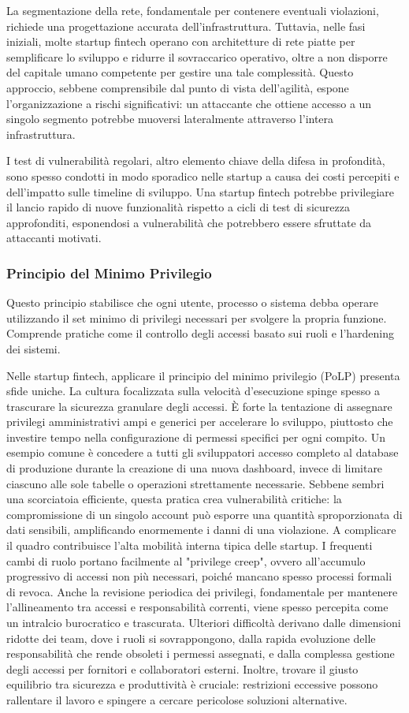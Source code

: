 \documentclass[a4paper,12pt]{report}
\begin{document}
La segmentazione della rete, fondamentale per contenere eventuali violazioni, richiede una progettazione accurata dell'infrastruttura. Tuttavia, nelle fasi iniziali, molte startup fintech operano con architetture di rete piatte per semplificare lo sviluppo e ridurre il sovraccarico operativo, oltre a non disporre del capitale umano competente per gestire una tale complessità. Questo approccio, sebbene comprensibile dal punto di vista dell'agilità, espone l'organizzazione a rischi significativi: un attaccante che ottiene accesso a un singolo segmento potrebbe muoversi lateralmente attraverso l'intera infrastruttura.

I test di vulnerabilità regolari, altro elemento chiave della difesa in profondità, sono spesso condotti in modo sporadico nelle startup a causa dei costi percepiti e dell'impatto sulle timeline di sviluppo. Una startup fintech potrebbe privilegiare il lancio rapido di nuove funzionalità rispetto a cicli di test di sicurezza approfonditi, esponendosi a vulnerabilità che potrebbero essere sfruttate da attaccanti motivati.
\subsubsection{Principio del Minimo Privilegio}
Questo principio stabilisce che ogni utente, processo o sistema debba operare utilizzando il set minimo di privilegi necessari per svolgere la propria funzione. Comprende pratiche come il controllo degli accessi basato sui ruoli e l'hardening dei sistemi.

Nelle startup fintech, applicare il principio del minimo privilegio (PoLP) presenta sfide uniche. La cultura focalizzata sulla velocità d'esecuzione spinge spesso a trascurare la sicurezza granulare degli accessi. È forte la tentazione di assegnare privilegi amministrativi ampi e generici per accelerare lo sviluppo, piuttosto che investire tempo nella configurazione di permessi specifici per ogni compito.
Un esempio comune è concedere a tutti gli sviluppatori accesso completo al database di produzione durante la creazione di una nuova dashboard, invece di limitare ciascuno alle sole tabelle o operazioni strettamente necessarie. Sebbene sembri una scorciatoia efficiente, questa pratica crea vulnerabilità critiche: la compromissione di un singolo account può esporre una quantità sproporzionata di dati sensibili, amplificando enormemente i danni di una violazione.
A complicare il quadro contribuisce l'alta mobilità interna tipica delle startup. I frequenti cambi di ruolo portano facilmente al "privilege creep", ovvero all'accumulo progressivo di accessi non più necessari, poiché mancano spesso processi formali di revoca. Anche la revisione periodica dei privilegi, fondamentale per mantenere l'allineamento tra accessi e responsabilità correnti, viene spesso percepita come un intralcio burocratico e trascurata.
Ulteriori difficoltà derivano dalle dimensioni ridotte dei team, dove i ruoli si sovrappongono, dalla rapida evoluzione delle responsabilità che rende obsoleti i permessi assegnati, e dalla complessa gestione degli accessi per fornitori e collaboratori esterni. Inoltre, trovare il giusto equilibrio tra sicurezza e produttività è cruciale: restrizioni eccessive possono rallentare il lavoro e spingere a cercare pericolose soluzioni alternative.
\end{document}
